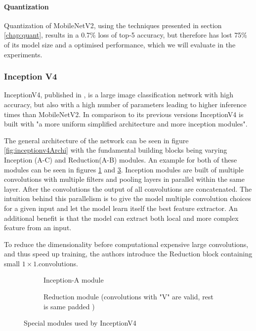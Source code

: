 \paragraph{Quantization}
Quantization of MobileNetV2, using the techniques presented in section \ref{chap:quant}, results in a  0.7\% loss of top-5 accuracy, but therefore has lost 75\% of its model size and a optimised performance, which we will evaluate in the experiments.



\subsubsection{Inception V4}
InceptionV4, published in \cite{InceptionV4}, is a large image classification network with high accuracy, but also with a high number of parameters leading to higher inference times than MobileNetV2.
In comparison to its previous versions InceptionV4 is built with "a more uniform simplified architecture and more inception modules". 

The general architecture of the network can be seen in figure \ref{fig:inceptionv4Archi} with the fundamental building blocks being varying Inception (A-C) and Reduction(A-B) modules. 
An example for both of these modules can be seen in figures \ref{fig:InceptionA} and \ref{fig:InceptionReduction}.
Inception modules are built of multiple convolutions with multiple filters and pooling layers in parallel within the same layer.
After the convolutions the output of all convolutions are concatenated.
The intuition behind this parallelism is to give the model multiple convolution choices for a given input and let the model learn itself  the best feature extractor. An additional benefit is that the model can extract both local and more complex feature from an input.

To reduce the dimensionality before computational expensive large convolutions, and thus speed up training, the authors introduce the Reduction block containing small $1\times1$.convolutions.   %




\begin{figure}[!htb]
\centering
\begin{subfigure}[b]{.95\textwidth}
\centering
   \resizebox{.8\linewidth}{!}{}
   \caption{Inception-A module}
   \label{fig:InceptionA} 
\end{subfigure}

\vspace{1em}
\begin{subfigure}[b]{.95\textwidth}
\centering
   \resizebox{.6\linewidth}{!}{}
   \caption{Reduction module (convolutions with "V" are valid, rest is same padded )}
   \label{fig:InceptionReduction}
\end{subfigure}

\caption{Special modules used by InceptionV4}

\end{figure}




